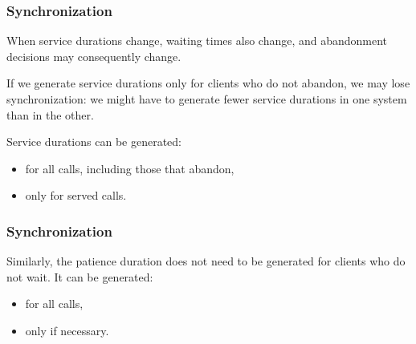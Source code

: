 \documentclass[t,usepdftitle=false]{beamer}
\begin{document}
\begin{frame}
	\frametitle{Synchronization}
	
	When service durations change, waiting times also change,
	and abandonment decisions may consequently change.
	
	\mbox{}
	
	If we generate service durations only for clients who do not abandon, we may lose synchronization:
	we might have to generate fewer service durations in one system than in the other.
	
	\mbox{}
	
	Service durations can be generated:
	\begin{itemize}
		\item[(a)] 
		for all calls, including those that abandon,
		\item[(b)] 
		only for served calls.
	\end{itemize}
	
\end{frame}

\begin{frame}
	\frametitle{Synchronization}
	
	Similarly, the patience duration does not need to be generated for 
	clients who do not wait. It can be generated:
	\begin{itemize}
		\item[(c)] 
		for all calls,
		\item[(d)] 
		only if necessary.
	\end{itemize}
	
\end{frame}
\end{document}
